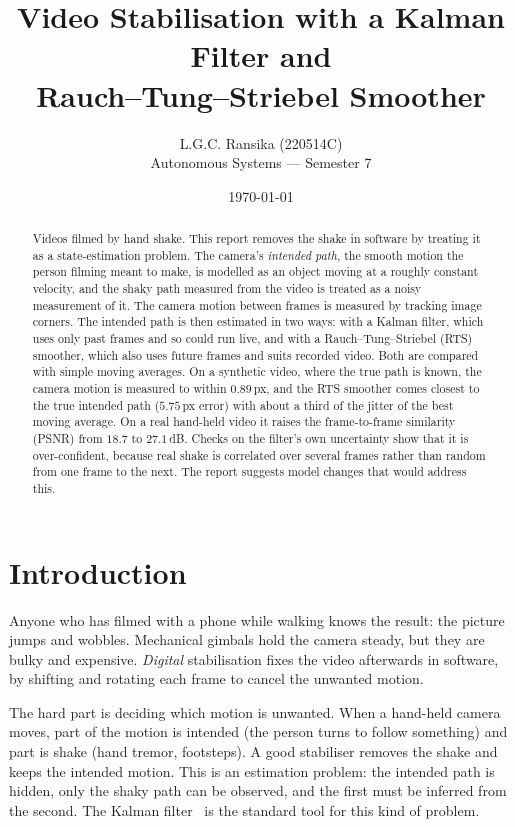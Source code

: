 \documentclass[11pt,a4paper]{article}
\title{Video Stabilisation with a Kalman Filter and\\ Rauch--Tung--Striebel Smoother}
\author{%
  L.G.C. Ransika \quad (220514C)\\[2pt]
  Autonomous Systems --- Semester 7}
\date{\today}
\begin{document}
\maketitle

\begin{abstract}
Videos filmed by hand shake. This report removes the shake in software by treating it as a
state-estimation problem. The camera's \emph{intended path}, the smooth motion the person
filming meant to make, is modelled as an object moving at a roughly constant velocity, and
the shaky path measured from the video is treated as a noisy measurement of it. The camera
motion between frames is measured by tracking image corners. The intended path is then
estimated in two ways: with a Kalman filter, which uses only past frames and so could run
live, and with a Rauch--Tung--Striebel (RTS) smoother, which also uses future frames and
suits recorded video. Both are compared with simple moving averages. On a synthetic video,
where the true path is known, the camera motion is measured to within $0.89$\,px, and the RTS
smoother comes closest to the true intended path ($5.75$\,px error) with about a third of the
jitter of the best moving average. On a real hand-held video it raises the frame-to-frame
similarity (PSNR) from $18.7$ to $27.1$\,dB. Checks on the filter's own uncertainty show that
it is over-confident, because real shake is correlated over several frames rather than random
from one frame to the next. The report suggests model changes that would address this.
\end{abstract}

\section{Introduction}
Anyone who has filmed with a phone while walking knows the result: the picture jumps and
wobbles. Mechanical gimbals hold the camera steady, but they are bulky and expensive.
\emph{Digital} stabilisation fixes the video afterwards in software, by shifting and rotating
each frame to cancel the unwanted motion.

The hard part is deciding which motion is unwanted. When a hand-held camera moves, part of
the motion is intended (the person turns to follow something) and part is shake (hand tremor,
footsteps). A good stabiliser removes the shake and keeps the intended motion. This is an
estimation problem: the intended path is hidden, only the shaky path can be observed, and the
first must be inferred from the second. The Kalman filter~\cite{kalman1960} is the standard
tool for this kind of problem.
\end{document}
